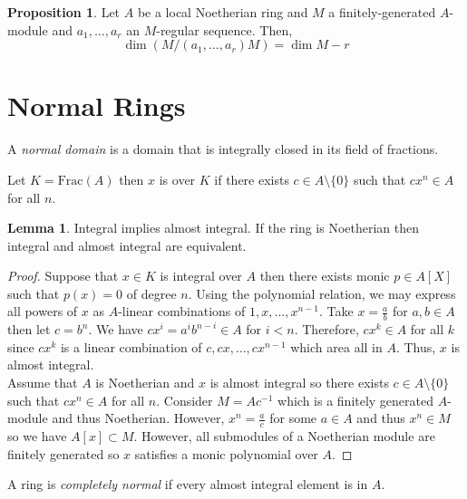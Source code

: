 \documentclass[12pt]{article}
\newcommand{\Frac}[1]{\mathrm{Frac}\left(#1\right)}
\theoremstyle{remark}
\theoremstyle{definition}
\newtheorem{lemma}[theorem]{Lemma}
\newtheorem{proposition}[theorem]{Proposition}
\newenvironment{definition}[1][Definition:]{\begin{trivlist}
\item[\hskip \labelsep {\bfseries #1}]}{\end{trivlist}}
\begin{document}
\begin{proposition}
Let $A$ be a local Noetherian ring and $M$ a finitely-generated $A$-module and $a_1, \dots, a_r$ an $M$-regular sequence. Then,
\[ \dim{(M / (a_1, \dots, a_r) M)} = \dim{M} - r \]
\end{proposition}

\section{Normal Rings}

\begin{definition}
A \textit{normal domain} is a domain that is integrally closed in its field of fractions. 
\end{definition}

\begin{definition}
Let $K = \Frac{A}$ then $x$ is  over $K$ if there exists $c \in A \setminus \{0\}$ such that $c x^n \in A$ for all $n$. 
\end{definition}

\begin{lemma}
Integral implies almost integral. If the ring is Noetherian then integral and almost integral are equivalent.
\end{lemma}

\begin{proof}
Suppose that $x \in K$ is integral over $A$ then there exists monic $p \in A[X]$ such that $p(x) = 0$ of degree $n$. Using the polynomial relation, we may express all powers of $x$ as $A$-linear combinations of $1, x, \dots, x^{n-1}$. Take $x = \frac{a}{b}$ for $a, b \in A$ then let $c = b^n$. We have $c x^i = a^i b^{n-i} \in A$ for $i < n$. Therefore, $c x^k \in A$ for all $k$ since $c x^k$ is a linear combination of $c, cx, \dots, cx^{n-1}$ which area all in $A$. Thus, $x$ is almost integral.
\bigskip\\
Assume that $A$ is Noetherian and $x$ is almost integral so there exists $c \in A \setminus \{0\}$ such that $c x^n \in A$ for all $n$. Consider $M = A c^{-1}$ which is a finitely generated $A$-module and thus Noetherian. However, $x^n = \frac{a}{c}$ for some $a \in A$ and thus $x^n \in M$ so we have $A[x] \subset M$. However, all submodules of a Noetherian module are finitely generated so $x$ satisfies a monic polynomial over $A$.   
\end{proof}

\begin{definition}
A ring is \textit{completely normal} if every almost integral element is in $A$.
\end{definition}
\end{document}

